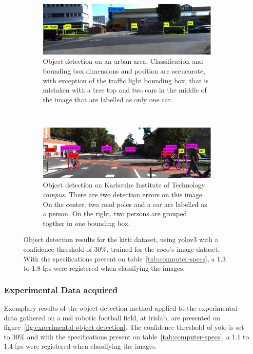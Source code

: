 \begin{figure}[ht!]
	\centering
	\begin{subfigure}[c]{0.8\textwidth}
		\includegraphics[width=\textwidth]{img/object-detection/kitti-4.jpg}
		\caption{Object detection on an urban area. Classification and bounding box dimensions and position are accucarate, with exception of the traffic light bounding box, that is mistaken with a tree top and two cars in the middle of the image that are labelled as only one car.}
		\label{fig:kitti-yolo-3}
	\end{subfigure}
	\\ \vspace{4mm}
	\begin{subfigure}[c]{0.8\textwidth}
		\includegraphics[width=\textwidth]{img/object-detection/kitti-2.jpg}
		\caption{Object detection on Karlsruhe Institute of Technology \textit{campus}. There are two detection errors on this image. On the center, two road poles and a car are labelled as a person. On the right, two persons are grouped togther in one bounding box.}
		\label{fig:kitti-yolo-2}
	\end{subfigure}
	\caption{Object detection results for the \ac{kitti} dataset, using \ac{yolo}v3 with a confidence threshold of 30\%, trained for the \ac{coco}'s image dataset. With the specifications present on table~\ref{tab:computer-specs}, a 1.3 to 1.8 \ac{fps} were registered when classifying the images.}
	\label{fig:kitti-object-detection}
\end{figure}


\subsubsection{Experimental Data acquired}
Exemplary results of the object detection method applied to the experimental data gathered on a \ac{msl} robotic football field, at \acf{irislab}, are presented on figure~\ref{fig:experimental-object-detection}. The confidence threshold of \ac{yolo} is set to 30\% and with the specifications present on table~\ref{tab:computer-specs}, a 1.1 to 1.4 \ac{fps} were registered when classifying the images.

